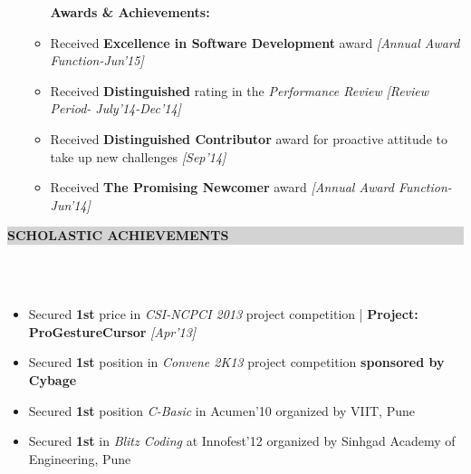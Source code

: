 \documentclass[a4paper,10pt]{article}
\newcommand{\hsep}{-0.6cm}
\newcommand{\resheading}[1]{{\small \colorbox{lightgray}{\begin{minipage}{1\textwidth}{\textbf{#1 \vphantom{p\^{E}}}}\end{minipage}}}}
\begin{document}
\begin{itemize}
\begin{itemize}
            \textbf{Awards \& Achievements:}\\[-0.55cm] 
            \item Received \textbf{Excellence in Software Development} award \hfill\emph{[Annual Award Function-Jun'15]}\\[-0.55cm] 
           \item Received \textbf{Distinguished} rating in the \textit{Performance Review} \hfill\emph{[Review Period- July'14-Dec'14]} \\[-0.55cm] 
           \item Received \textbf{Distinguished Contributor} award for proactive attitude to take up new challenges \hfill\emph{[Sep'14]} \\[-0.55cm] 
            \item Received \textbf{The Promising Newcomer} award \hfill\emph{[Annual Award Function-Jun'14]}\\[-0.5cm]
           
        \end{itemize}
\end{itemize}


\hspace{-0.5cm}
\resheading{\textbf{\large SCHOLASTIC ACHIEVEMENTS}} \\[\hsep]
\\[-0.2cm]
\begin{itemize}
  \item Secured \textbf{1st} price in \textit{CSI-NCPCI 2013} project competition | \textbf{Project:  ProGestureCursor} \hfill\emph{[Apr'13]} \\[-0.7cm]
  \item Secured \textbf{1st} position in \textit{Convene 2K13} project competition \textbf{sponsored by Cybage}\\[-0.7cm]
  \item Secured \textbf{1st} position \textit{C-Basic} in Acumen'10 organized by VIIT, Pune\\[-0.7cm]
  \item Secured \textbf{1st} in \textit{Blitz Coding} at Innofest'12 organized by Sinhgad Academy of Engineering, Pune\\[-0.5cm] 
\end{itemize}
\end{document}
